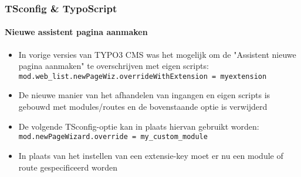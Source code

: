 
\begin{frame}[fragile]
	\frametitle{TSconfig \& TypoScript}
	\framesubtitle{Nieuwe assistent pagina aanmaken}

	\begin{itemize}
		\item In vorige versies van TYPO3 CMS was het mogelijk om de "Assistent nieuwe pagina aanmaken"
		 	te overschrijven met eigen scripts:\newline
			\small
				\texttt{mod.web\_list.newPageWiz.overrideWithExtension = myextension}
			\normalsize
		\item De nieuwe manier van het afhandelen van ingangen en eigen scripts is gebouwd met modules/routes
		 	en de bovenstaande optie is verwijderd
		\item De volgende TSconfig-optie kan in plaats hiervan gebruikt worden:
			\small
				\texttt{mod.newPageWizard.override = my\_custom\_module}
			\normalsize

		\item In plaats van het instellen van een extensie-key moet er nu een module of
		 	route gespecificeerd worden

	\end{itemize}

\end{frame}

